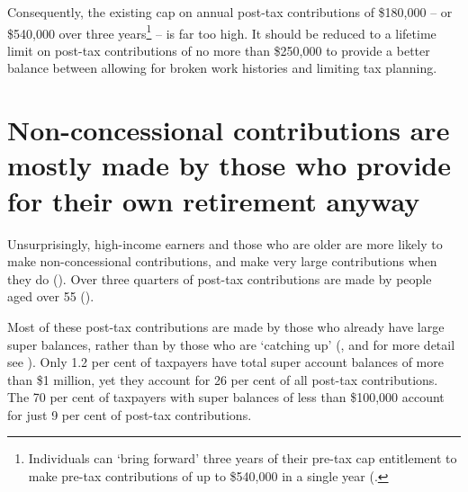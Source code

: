 Consequently, the existing cap on annual post-tax contributions of \$180,000 – or \$540,000 over three years\footnote{Individuals can ‘bring forward’ three years of their pre-tax cap entitlement to make pre-tax contributions of up to \$540,000 in a single year (\textcite{ATO2015SuperContr--too-much-super-can-mean-extra-tax}.} – is far too high.  It should be reduced to a lifetime limit on post-tax contributions of no more than \$250,000 to provide a better balance between allowing for broken work histories and limiting tax planning. 

\section{Non-concessional contributions are mostly made by those who provide for their own retirement anyway}\label{sec:SUPER-5-1}
Unsurprisingly, high-income earners and those who are older are more likely to make non-concessional contributions, and make very large contributions when they do (). Over three quarters of post-tax contributions are made by people aged over 55 (). 

Most of these post-tax contributions are made by those who already have large super balances, rather than by those who are ‘catching up’ (, and for more detail see ). Only 1.2 per cent of taxpayers have total super account balances of more than \$1 million, yet they account for 26 per cent of all post-tax contributions. The 70 per cent of taxpayers with super balances of less than \$100,000 account for just 9 per cent of post-tax contributions.  

